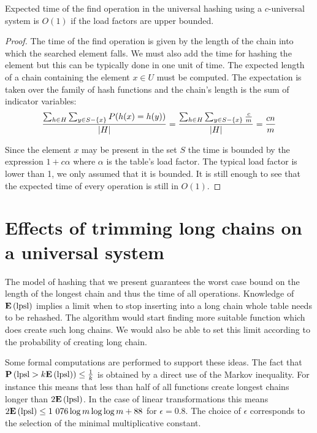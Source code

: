 \begin{theorem}
\label{theorem-expected-chain-length-universal}
Expected time of the find operation in the universal hashing using a $c$-universal system is $O(1)$ if the load factors are upper bounded.
\end{theorem}
\begin{proof}
The time of the find operation is given by the length of the chain into which the searched element falls. We must also add the time for hashing the element but this can be typically done in one unit of time. The expected length of a chain containing the element $x \in U$ must be computed. The expectation is taken over the family of hash functions and the chain's length is the sum of indicator variables:
\begin{displaymath}
\frac{\sum\displaylimits_{h \in H} \sum\displaylimits_{y \in S - \lbrace x \rbrace} P(h(x) = h(y))}{|H|} = \frac{\sum\displaylimits_{h \in H} \sum\displaylimits_{y \in S - \lbrace x \rbrace} \frac{c}{m}}{|H|} = \frac{cn}{m}
\end{displaymath}

Since the element $x$ may be present in the set $S$ the time is bounded by the expression $1 + c\alpha$ where $\alpha$ is the table's load factor. The typical load factor is lower than 1, we only assumed that it is bounded. It is still enough to see that the expected time of every operation is still in $O(1)$.
\end{proof}

\section{Effects of trimming long chains on a universal system}
The model of hashing that we present guarantees the worst case bound on the length of the longest chain and thus the time of all operations. Knowledge of $\mathbf{E}\left(\mathrm{lpsl}\right)$ implies a limit when to stop inserting into a long chain whole table needs to be rehashed. The algorithm would start finding more suitable function which does create such long chains. We would also be able to set this limit according to the probability of creating long chain.

Some formal computations are performed to support these ideas. The fact that $\mathbf{P}\left(\mathrm{lpsl} > k \mathbf{E}\left(\mathrm{lpsl}\right)\right) \leq \frac{1}{k}$ is obtained by a direct use of the Markov inequality. For instance this means that less than half of all functions create longest chains longer than $2 \mathbf{E}\left(\mathrm{lpsl}\right)$. In the case of linear transformations this means $2\mathbf{E}\left(\mathrm{lpsl}\right) \leq \text{1 076} \log m \log \log m + 88$ for $\epsilon = 0.8$. The choice of $\epsilon$ corresponds to the selection of the minimal multiplicative constant.

